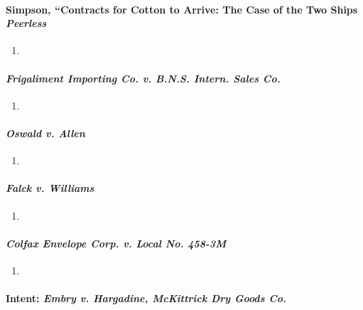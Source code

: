 \paragraph{Simpson, ``Contracts for Cotton to Arrive: The Case of the Two 
Ships \emph{Peerless}}

\begin{enumerate}
    \item %
\end{enumerate}

\paragraph{\emph{Frigaliment Importing Co. v. B.N.S. Intern. Sales Co.}}

\begin{enumerate}
    \item %
\end{enumerate}

\paragraph{\emph{Oswald v. Allen}}

\begin{enumerate}
    \item %
\end{enumerate}

\paragraph{\emph{Falck v. Williams}}

\begin{enumerate}
    \item %
\end{enumerate}

\paragraph{\emph{Colfax Envelope Corp. v. Local No. 458-3M}}

\begin{enumerate}
    \item %
\end{enumerate}

\paragraph{Intent: \emph{Embry v. Hargadine, McKittrick Dry Goods Co.}}

